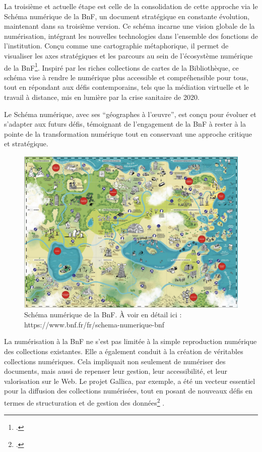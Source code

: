 \documentclass[a4paper,12pt,twoside]{book}
\begin{document}
	La troisième et actuelle étape est celle de la consolidation de cette approche via le Schéma numérique de la BnF, un document stratégique en constante évolution, maintenant dans sa troisième version. Ce schéma incarne une vision globale de la numérisation, intégrant les nouvelles technologies dans l’ensemble des fonctions de l’institution.  Conçu comme une cartographie métaphorique, il permet de visualiser les axes stratégiques et les parcours au sein de l’écosystème numérique de la BnF\footcite{racine_schema_2009}. Inspiré par les riches collections de cartes de la Bibliothèque, ce schéma vise à rendre le numérique plus accessible et compréhensible pour tous, tout en répondant aux défis contemporains, tels que la médiation virtuelle et le travail à distance, mis en lumière par la crise sanitaire de 2020. 
	
	Le Schéma numérique, avec ses “géographes à l’œuvre”, est conçu pour évoluer et s’adapter aux futurs défis, témoignant de l’engagement de la BnF à rester à la pointe de la transformation numérique tout en conservant une approche critique et stratégique.
	\\
	
	\begin{figure}[h!]
		\centering
		\includegraphics[width=\textwidth]{images/schema-bnf-num.png}
		\caption{Schéma numérique de la BnF. À voir en détail ici : 
			https://www.bnf.fr/fr/schema-numerique-bnf}
		\label{fig:monimage}
	\end{figure}
	

	La numérisation à la BnF ne s’est pas limitée à la simple reproduction numérique des collections existantes. Elle a également conduit à la création de véritables collections numériques. Cela impliquait non seulement de numériser des documents, mais aussi de repenser leur gestion, leur accessibilité, et leur valorisation sur le Web. Le projet Gallica, par exemple, a été un vecteur essentiel pour la diffusion des collections numérisées, tout en posant de nouveaux défis en termes de structuration et de gestion des données\footcite{bermes_numerique_2020} .
	
\end{document}

